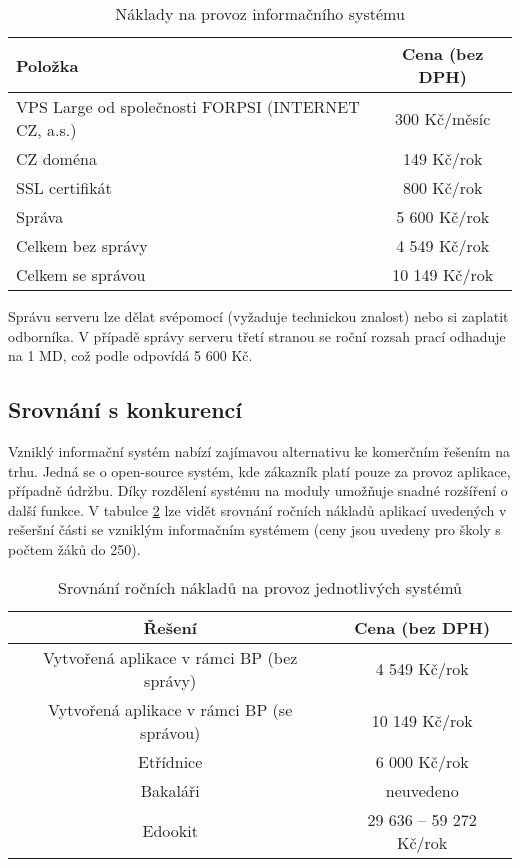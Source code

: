 \begin{table}[h]
    \centering
    \begin{tabular}{|p{6cm}|c|}
        \hline
         Položka & Cena (bez DPH) \\
         \hline
         \hline
         VPS Large od společnosti FORPSI (INTERNET CZ, a.s.) \cite{linux-server} & 300 Kč/měsíc \\
         \hline
         CZ doména & 149 Kč/rok \\
         \hline
         SSL certifikát & 800 Kč/rok \\
         \hline
         Správa & 5 600 Kč/rok \\
         \hline
         \hline
         Celkem bez správy & 4 549 Kč/rok \\
         \hline
         Celkem se správou & 10 149 Kč/rok \\
         \hline
    \end{tabular}
    \caption{Náklady na provoz informačního systému}
    \label{tab:service-prices}
\end{table}

Správu serveru lze dělat svépomocí (vyžaduje technickou znalost) nebo si zaplatit odborníka. V případě správy serveru třetí stranou se roční rozsah prací odhaduje na 1 MD, což podle \cite{md-benchmark} odpovídá 5 600 Kč.


\subsection{Srovnání s konkurencí}
Vzniklý informační systém nabízí zajímavou alternativu ke komerčním řešením na trhu. Jedná se o open-source systém, kde zákazník platí pouze za provoz aplikace, případně údržbu. Díky rozdělení systému na moduly umožňuje snadné rozšíření o další funkce. V tabulce \ref{tab:prices-comparasion} lze vidět srovnání ročních nákladů aplikací uvedených v rešeršní části se vzniklým informačním systémem (ceny jsou uvedeny pro školy s počtem žáků do 250).

\begin{table}[h]
    \centering
    \begin{tabular}{|c|c|}
        \hline
         Řešení & Cena (bez DPH) \\
         \hline
         \hline
         Vytvořená aplikace v rámci BP (bez správy) & 4 549 Kč/rok \\
         \hline
         Vytvořená aplikace v rámci BP (se správou) & 10 149 Kč/rok \\
         \hline
         Etřídnice & 6 000 Kč/rok \\
         \hline
         Bakaláři & neuvedeno \\
         \hline
         Edookit & 29 636 -- 59 272 Kč/rok \\
         \hline
    \end{tabular}
    \caption{Srovnání ročních nákladů na provoz jednotlivých systémů}
    \label{tab:prices-comparasion}
\end{table}


